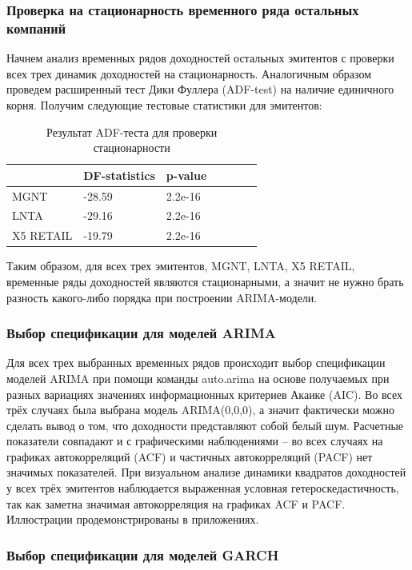 \documentclass[a4paper,12pt,twoside]{article}
\begin{document}
\subsubsection{Проверка на стационарность временного ряда остальных компаний}

Начнем анализ временных рядов доходностей остальных эмитентов с проверки всех трех динамик доходностей на стационарность.
Аналогичным образом проведем расширенный тест Дики Фуллера (ADF-test) на наличие единичного корня.
Получим следующие тестовые статистики для эмитентов:

\begin{table}[!h]
\centering
\begin{tabular}{lllllll}
  \hline
          & DF-statistics &  p-value  \\
  \hline
  MGNT   & -28.59 & 2.2e-16 \\
  LNTA  & -29.16 &  2.2e-16 \\
  X5 RETAIL  & -19.79 &  2.2e-16 \\
  \hline
\end{tabular}
\caption{Результат ADF-теста для проверки стационарности}
\end{table}

Таким образом, для всех трех эмитентов, MGNT, LNTA, X5 RETAIL, временные ряды доходностей являются стационарными, а значит не нужно брать разность какого-либо порядка при построении ARIMA-модели.

\subsubsection{Выбор спецификации для моделей ARIMA}

Для всех трех выбранных временных рядов происходит выбор спецификации моделей ARIMA при помощи команды auto.arima на основе получаемых при разных вариациях значениях информационных критериев Акаике (AIC).
Во всех трёх случаях была выбрана модель ARIMA(0,0,0), а значит фактически можно сделать вывод о том, что доходности представляют собой белый шум. Расчетные показатели совпадают и с графическими наблюдениями – во всех случаях на графиках автокорреляций (ACF) и частичных автокорреляций (PACF) нет значимых показателей.
При визуальном анализе динамики квадратов доходностей у всех трёх эмитентов наблюдается выраженная условная гетероскедастичность, так как заметна значимая автокорреляция на графиках ACF и PACF. Иллюстрации продемонстрированы в приложениях.

\subsubsection{Выбор спецификации для моделей GARCH}
\end{document}
